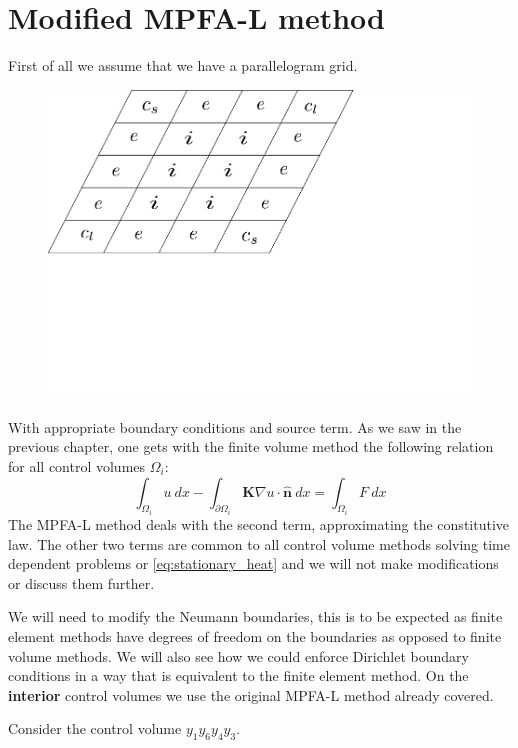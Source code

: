\documentclass[../Main/main.tex]{subfiles}
\begin{document}
	\section*{Modified MPFA-L method}
	First of all we assume that we have a parallelogram grid.
	\begin{figure}[H]\label{fig:paralellogram mesh}
		\centering
		\includegraphics[width=1\textwidth]{paralellogram_mesh.pdf}
	\end{figure}
	With appropriate boundary conditions and source term.
	As we saw in the previous chapter, one gets with the finite volume method the following relation for all control volumes $\Omega_i$:
	\begin{equation}
		\int_{\Omega_i} u \ dx - \int_{\partial \Omega_i} \pmb{K}\nabla u \cdot \hat{\pmb{n}}\ dx = \int_{\Omega_i} F \ dx
	\end{equation}
	The MPFA-L method deals with the second term, approximating the constitutive law. The other two terms are common to all control volume methods solving time dependent problems or \eqref{eq:stationary_heat} and we will not make modifications or discuss them further.
	\par
	We will need to modify the Neumann boundaries, this is to be expected as finite element methods have degrees of freedom on the boundaries as opposed to finite volume methods. We will also see how we could enforce Dirichlet boundary conditions in a way that is equivalent to the finite element method. On the \textbf{interior} control volumes we use the original MPFA-L method already covered.
	\par
	Consider the control volume $y_1 y_6 y_4 y_3$. 
\end{document}
